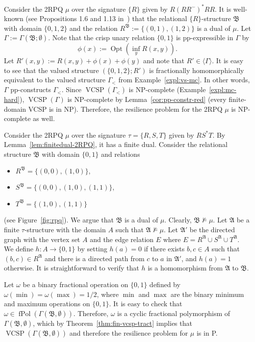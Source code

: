 \documentclass[nonacm]{acmart}
\newcommand{\bA}{{\mathfrak A}}
\newcommand{\bB}{{\mathfrak B}}
\DeclareMathOperator{\fPol}{fPol}
\DeclareMathOperator{\VCSP}{VCSP}
\DeclareMathOperator{\Opt}{Opt}
\begin{document}
\begin{example}
    Consider the 2RPQ $\mu$ over the signature $\{R\}$
    given by $R(R R^{-})^* RR$. It is well-known (see Propositions 1.6 and 1.13 in~\cite{HNBook}) that the relational $\{R\}$-structure $\bB$  with domain 
    $\{0,1,2\}$ and the relation
    $R^{\bB} := \{(0,1),(1,2)\}$ is a dual of $\mu$. Let $\Gamma := \Gamma(\bB; \emptyset)$. Note that the crisp unary relation $\{0,1\}$ is pp-expressible in $\Gamma$ by
    $$\phi(x) := \Opt (\inf_{y} R(x,y)).$$
    Let $R'(x,y) := R(x,y) + \phi(x) + \phi(y)$ and note that $R' \in \langle \Gamma \rangle$. It is easy to see that the valued structure $(\{0,1,2\}; R')$ is fractionally homomorphically equivalent to the valued structure $\Gamma_{<}$ from Example~\ref{expl:vs-mc}. In other words, $\Gamma$ pp-constructs $\Gamma_{<}$. Since $\VCSP(\Gamma_{<})$ is NP-complete (Example~\ref{expl:mc-hard}), $\VCSP(\Gamma)$ is NP-complete by Lemma~\ref{cor:pp-constr-red} (every finite-domain VCSP is in NP). Therefore, the resilience problem for the 2RPQ $\mu$ is NP-complete as well.
\end{example}


\begin{example} \label{expl:rpq-tract}
    Consider the 2RPQ $\mu$ over the signature $\tau=\{R,S,T\}$
    given by $RS^*T$.
    By Lemma~\ref{lem:finitedual-2RPQ},
    it has a finite dual. Consider the relational structure $\bB$ with  domain $\{0,1\}$ and relations
    \begin{itemize}
        \item $R^{\bB} = \{(0,0),(1,0)\}$, 
       \item $S^{\bB} = \{(0,0),(1,0),(1,1)\}$, 
       \item $T^{\bB} = \{(1,0),(1,1)\}$
    \end{itemize}
    (see Figure~\ref{fig:rpq}).
    We argue that $\bB$ is a dual of $\mu$. Clearly, $\bB \not\models \mu$. Let $\bA$ be a finite $\tau$-structure
    with the domain $A$ such that $\bA \not \models \mu$. Let $\bA'$ be the directed graph with the vertex set $A$ and the edge relation $E$ where $E = R^\bA \cup S^{\bA} \cup T^{\bA}$. We define $h \colon A \to \{0,1\}$ by setting $h(a)=0$ if there exists $b,c \in A$ such that $(b,c) \in R^{\bA}$ and there is a directed path from $c$ to $a$ in $\bA'$,
    and $h(a)=1$ otherwise. It is straightforward to verify that $h$ is a homomorphism from $\bA$ to $\bB$.

Let $\omega$ be a binary fractional operation on $\{0,1\}$ defined by $\omega(\min)=\omega(\max) = 1/2$, where $\min$ and $\max$ are the binary minimum and maximum operations on $\{0,1\}$. It is easy to check that $\omega \in \fPol(\Gamma(\bB, \emptyset))$.
    Therefore, $\omega$ is a cyclic fractional polymorphism of $\Gamma(\bB, \emptyset)$, which by Theorem~\ref{thm:fin-vcsp-tract} implies that $\VCSP(\Gamma(\bB, \emptyset))$ and therefore
    the resilience problem for $\mu$ is in P.
\end{example}
\end{document}
